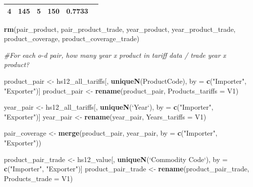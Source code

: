 \documentclass[10pt,]{article}
\newenvironment{Shaded}{\begin{snugshade}}{\end{snugshade}}
\newcommand{\KeywordTok}[1]{\textcolor[rgb]{0.13,0.29,0.53}{\textbf{{#1}}}}
\newcommand{\DataTypeTok}[1]{\textcolor[rgb]{0.13,0.29,0.53}{{#1}}}
\newcommand{\StringTok}[1]{\textcolor[rgb]{0.31,0.60,0.02}{{#1}}}
\newcommand{\CommentTok}[1]{\textcolor[rgb]{0.56,0.35,0.01}{\textit{{#1}}}}
\newcommand{\NormalTok}[1]{{#1}}
\begin{document}
\begin{longtable}[]{@{}cccccc@{}}
\begin{minipage}[t]{0.16\columnwidth}
4\strut
\end{minipage} & \begin{minipage}[t]{0.16\columnwidth}\centering\strut
145\strut
\end{minipage} & \begin{minipage}[t]{0.14\columnwidth}\centering\strut
5\strut
\end{minipage} & \begin{minipage}[t]{0.14\columnwidth}\centering\strut
150\strut
\end{minipage} & \begin{minipage}[t]{0.10\columnwidth}\centering\strut
0.7733\strut
\end{minipage}\tabularnewline
\bottomrule
\end{longtable}

\begin{Shaded}
\begin{Highlighting}[]
\KeywordTok{rm}\NormalTok{(pair_product, pair_product_trade, year_product, }
   \NormalTok{year_product_trade, product_coverage, product_coverage_trade)}

\CommentTok{#For each o-d pair, how many year x product in tariff data / trade year x product?}

\NormalTok{product_pair <-}\StringTok{ }\NormalTok{hs12_all_tariffs[, }\KeywordTok{uniqueN}\NormalTok{(ProductCode), by =}\StringTok{ }\KeywordTok{c}\NormalTok{(}\StringTok{"Importer"}\NormalTok{, }\StringTok{"Exporter"}\NormalTok{)]}
\NormalTok{product_pair <-}\StringTok{ }\KeywordTok{rename}\NormalTok{(product_pair, }\DataTypeTok{Products_tariffs =} \NormalTok{V1)}

\NormalTok{year_pair <-}\StringTok{ }\NormalTok{hs12_all_tariffs[, }\KeywordTok{uniqueN}\NormalTok{(}\StringTok{`}\DataTypeTok{Year}\StringTok{`}\NormalTok{), by =}\StringTok{ }\KeywordTok{c}\NormalTok{(}\StringTok{"Importer"}\NormalTok{, }\StringTok{"Exporter"}\NormalTok{)]}
\NormalTok{year_pair <-}\StringTok{ }\KeywordTok{rename}\NormalTok{(year_pair, }\DataTypeTok{Years_tariffs =} \NormalTok{V1)}

\NormalTok{pair_coverage <-}\StringTok{ }\KeywordTok{merge}\NormalTok{(product_pair, year_pair, }\DataTypeTok{by =} \KeywordTok{c}\NormalTok{(}\StringTok{"Importer"}\NormalTok{, }\StringTok{"Exporter"}\NormalTok{))}

\NormalTok{product_pair_trade <-}\StringTok{ }\NormalTok{hs12_value[, }\KeywordTok{uniqueN}\NormalTok{(}\StringTok{`}\DataTypeTok{Commodity Code}\StringTok{`}\NormalTok{), by =}\StringTok{ }\KeywordTok{c}\NormalTok{(}\StringTok{"Importer"}\NormalTok{, }\StringTok{"Exporter"}\NormalTok{)]}
\NormalTok{product_pair_trade <-}\StringTok{ }\KeywordTok{rename}\NormalTok{(product_pair_trade, }\DataTypeTok{Products_trade =} \NormalTok{V1)}


\end{Highlighting}
\end{Shaded}
\end{document}
